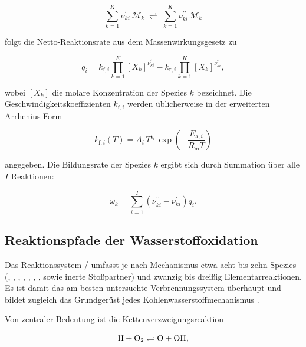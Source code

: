 \begin{equation}
	\label{eq:elementarreaktion}
	\sum_{k=1}^{K} \nu_{ki}^{\prime}\,\mathcal{M}_k
	\;\rightleftharpoons\;
	\sum_{k=1}^{K} \nu_{ki}^{\prime\prime}\,\mathcal{M}_k
\end{equation}

folgt die Netto-Reaktionsrate aus dem Massenwirkungsgesetz zu

\begin{equation}
	\label{eq:reaktionsrate}
	q_i = k_{\mathrm{f},i} \prod_{k=1}^{K} \left[X_k\right]^{\nu_{ki}^{\prime}}
	    - k_{\mathrm{r},i} \prod_{k=1}^{K} \left[X_k\right]^{\nu_{ki}^{\prime\prime}},
\end{equation}

wobei $\left[X_k\right]$ die molare Konzentration der Spezies $k$ bezeichnet.
Die Geschwindigkeitskoeffizienten $k_{\mathrm{f},i}$ werden üblicherweise in
der erweiterten Arrhenius-Form

\begin{equation}
	\label{eq:arrhenius}
	k_{\mathrm{f},i}(T) = A_i\,T^{b_i}\,\exp\!\left(-\frac{E_{\mathrm{a},i}}{R_\mathrm{m} T}\right)
\end{equation}

angegeben. Die Bildungsrate der Spezies $k$ ergibt sich durch Summation über
alle $I$ Reaktionen:

\begin{equation}
	\label{eq:speziesquellterm}
	\dot{\omega}_k = \sum_{i=1}^{I}
	\left(\nu_{ki}^{\prime\prime} - \nu_{ki}^{\prime}\right) q_i.
\end{equation}

\subsection{Reaktionspfade der Wasserstoffoxidation}\label{subsec:reaktionspfade}

Das Reaktionssystem / umfasst je nach Mechanismus etwa
acht bis zehn Spezies (, , , , , ,
,  sowie inerte Stoßpartner) und zwanzig bis dreißig
Elementarreaktionen. Es ist damit das am besten untersuchte Verbrennungssystem
überhaupt und bildet zugleich das Grundgerüst jedes
Kohlenwasserstoffmechanismus \cite{Law_2006}.

Von zentraler Bedeutung ist die Kettenverzweigungsreaktion

\begin{equation}
	\label{eq:kettenverzweigung}
	\ce{H} + \ce{O2} \rightleftharpoons \ce{O} + \ce{OH},
\end{equation}


